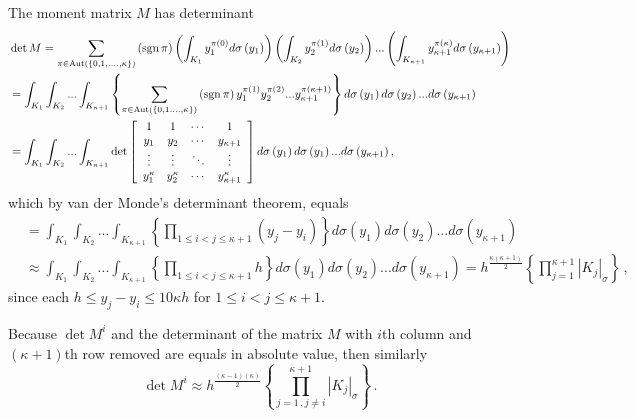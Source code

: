 \documentclass{amsart}%
\theoremstyle{plain}
\numberwithin{equation}{section}
\begin{document}
The moment matrix $M$ has determinant%
\begin{align*}
	&  \det M =\sum_{\pi \in\operatorname*{Aut}\left(  \left\{
0,1,....,\kappa\right\}  \right)  }\left(  \operatorname{sgn}\pi\right)
\left(  \int_{K_{1}}y_{1}^{\pi\left(  0\right)  }d\sigma\left(
y_{1}\right)  \right)  \left(  \int_{K_{2}}y_{2}^{\pi\left(  1\right)
}d\sigma\left(  y_{2}\right)  \right)  ...\left(  \int_{K_{\kappa+1}}%
y_{\kappa+1}^{\pi\left(  \kappa\right)  }d\sigma\left(  y_{\kappa
+1}\right)  \right)  \\
&  =  \int_{K_{1}}\int_{K_{2}}...\int_{K_{\kappa+1}}\left\{
\sum_{\pi\in\operatorname*{Aut}\left(  \left\{  0,1....,\kappa\right\}
\right)  }\left(  \operatorname{sgn}\pi\right)  y_{1}^{\pi\left(
1\right)  }y_{2}^{\pi\left(  2\right)  }...y_{\kappa+1}^{\pi\left(
\kappa+1\right)  }\right\}  d\sigma\left(  y_{1}\right)  d\sigma\left(
y_{2}\right)  ...d\sigma\left(  y_{\kappa+1}\right)  \\
&  = \int_{K_{1}}\int_{K_{2}}...\int_{K_{\kappa+1}}\det\left[
\begin{array}
[c]{cccc}%
1 & 1 & \cdots & 1\\
y_{1} & y_{2} & \cdots & y_{\kappa+1}\\
\vdots & \vdots & \ddots & \vdots\\
y_{1}^{\kappa} & y_{2}^{\kappa} & \cdots & y_{\kappa+1}^{\kappa}%
\end{array}
\right]  d\sigma\left(  y_{1}\right)  d\sigma\left(  y_{1}\right)
...d\sigma\left(  y_{\kappa+1}\right)  ,
\end{align*}
which by van der Monde's determinant theorem, equals 
\begin{align*}
&  =  \int_{K_{1}}\int_{K_{2}}...\int_{K_{\kappa+1}%
}\left\{  \prod_{1\leq i<j\leq\kappa+1}\left(  y_{j}-y_{i}\right)  \right\}
d\sigma\left(  y_{1}\right)  d\sigma\left(  y_{2}\right)  ...d\sigma\left(
y_{\kappa+1}\right)  \\
&  \approx   \int_{K_{1}}\int_{K_{2}}...\int_{K_{\kappa+1}%
}\left\{  \prod_{1\leq i<j\leq\kappa+1} h  \right\}
d\sigma\left(  y_{1}\right)  d\sigma\left(  y_{2}\right)  ...d\sigma\left(
	y_{\kappa+1}\right) = h^{\frac{\kappa\left(  \kappa+1\right)}{2}} \left \{ \prod\limits_{j=1}^{\kappa+1} \left | K_j \right |_{\sigma} \right \}   \, ,
\end{align*}
since each $h \leq y_{j}-y_{i}\leq 10 \kappa  h$ for $1\leq i<j\leq\kappa+1$.

Because $\det M^i$ and the determinant of the matrix $M$ with $i$th column and $(\kappa+1)$th row removed are equals in absolute value, then similarly
\[
	\det M^i \approx h^{\frac{\left ( \kappa -1\right )\left(  \kappa\right)}{2}} \left \{ \prod\limits_{j=1 \, , j \neq i}^{\kappa+1} \left | K_j \right |_{\sigma} \right \} \, .
\]
\end{document}

